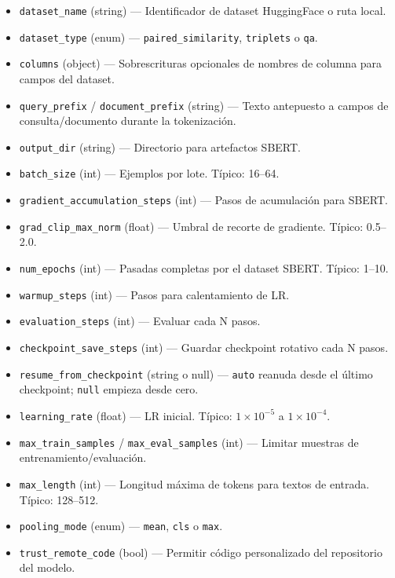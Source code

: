 \begin{itemize}[nosep]
    \item \texttt{dataset\_name} (string) --- Identificador de dataset HuggingFace o ruta local.
    \item \texttt{dataset\_type} (enum) --- \texttt{paired\_similarity}, \texttt{triplets} o \texttt{qa}.
    \item \texttt{columns} (object) --- Sobrescrituras opcionales de nombres de columna para campos del dataset.
    \item \texttt{query\_prefix} / \texttt{document\_prefix} (string) --- Texto antepuesto a campos de consulta/documento durante la tokenización.
    \item \texttt{output\_dir} (string) --- Directorio para artefactos SBERT.
    \item \texttt{batch\_size} (int) --- Ejemplos por lote. Típico: 16--64.
    \item \texttt{gradient\_accumulation\_steps} (int) --- Pasos de acumulación para SBERT.
    \item \texttt{grad\_clip\_max\_norm} (float) --- Umbral de recorte de gradiente. Típico: 0.5--2.0.
    \item \texttt{num\_epochs} (int) --- Pasadas completas por el dataset SBERT. Típico: 1--10.
    \item \texttt{warmup\_steps} (int) --- Pasos para calentamiento de LR.
    \item \texttt{evaluation\_steps} (int) --- Evaluar cada N pasos.
    \item \texttt{checkpoint\_save\_steps} (int) --- Guardar checkpoint rotativo cada N pasos.
    \item \texttt{resume\_from\_checkpoint} (string o null) --- \texttt{auto} reanuda desde el último checkpoint; \texttt{null} empieza desde cero.
    \item \texttt{learning\_rate} (float) --- LR inicial. Típico: $1\times10^{-5}$ a $1\times10^{-4}$.
    \item \texttt{max\_train\_samples} / \texttt{max\_eval\_samples} (int) --- Limitar muestras de entrenamiento/evaluación.
    \item \texttt{max\_length} (int) --- Longitud máxima de tokens para textos de entrada. Típico: 128--512.
    \item \texttt{pooling\_mode} (enum) --- \texttt{mean}, \texttt{cls} o \texttt{max}.
    \item \texttt{trust\_remote\_code} (bool) --- Permitir código personalizado del repositorio del modelo.

\end{itemize}
